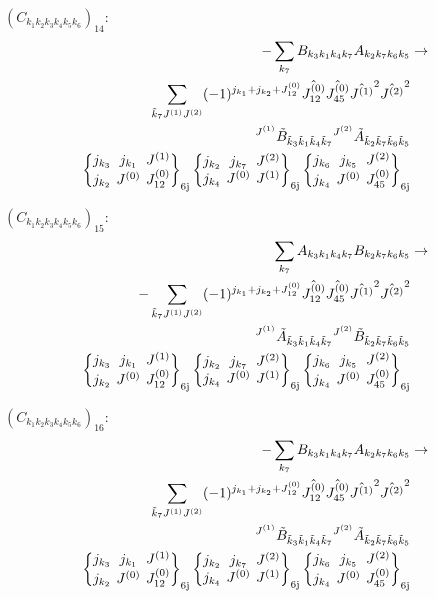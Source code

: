 \documentclass[11pt]{article}
\newcommand{\sixj}[6]{\begingroup\setlength{\arraycolsep}{0.2em}\begin{Bmatrix} #1 & #2 & #3 \\ #4 & #5 & #6 \end{Bmatrix}_{\text{6j}}\endgroup}
\begin{document}
$\left({C}_{{k}_{1}{k}_{2}{k}_{3}{k}_{4}{k}_{5}{k}_{6}}\right)_{14}$:
\begin{align}
-\sum_{{k}_{7}}{B}_{{k}_{3}{k}_{1}{k}_{4}{k}_{7}}{A}_{{k}_{2}{k}_{7}{k}_{6}{k}_{5}}&\rightarrow \notag \\\sum_{\tilde{k}_{7}J^{(1)}J^{(2)}}(-1)^{j_{{k}_{1}} +j_{{k}_{2}} +J^{(0)}_{12} }\hat{J^{(0)}_{12}}\hat{J^{(0)}_{45}}\hat{J^{(1)}}^{2}\hat{J^{(2)}}^{2}& \notag \\{}^{J^{(1)}}\tilde{B}_{\tilde{k}_{3}\tilde{k}_{1}\tilde{k}_{4}\tilde{k}_{7}}{}^{J^{(2)}}\tilde{A}_{\tilde{k}_{2}\tilde{k}_{7}\tilde{k}_{6}\tilde{k}_{5}}& \notag \\\sixj{j_{{k}_{3}}}{j_{{k}_{1}}}{J^{(1)}}{j_{{k}_{2}}}{J^{(0)}}{J^{(0)}_{12}}\sixj{j_{{k}_{2}}}{j_{{k}_{7}}}{J^{(2)}}{j_{{k}_{4}}}{J^{(0)}}{J^{(1)}}\sixj{j_{{k}_{6}}}{j_{{k}_{5}}}{J^{(2)}}{j_{{k}_{4}}}{J^{(0)}}{J^{(0)}_{45}}
\end{align}

$\left({C}_{{k}_{1}{k}_{2}{k}_{3}{k}_{4}{k}_{5}{k}_{6}}\right)_{15}$:
\begin{align}
\sum_{{k}_{7}}{A}_{{k}_{3}{k}_{1}{k}_{4}{k}_{7}}{B}_{{k}_{2}{k}_{7}{k}_{6}{k}_{5}}&\rightarrow \notag \\-\sum_{\tilde{k}_{7}J^{(1)}J^{(2)}}(-1)^{j_{{k}_{1}} +j_{{k}_{2}} +J^{(0)}_{12} }\hat{J^{(0)}_{12}}\hat{J^{(0)}_{45}}\hat{J^{(1)}}^{2}\hat{J^{(2)}}^{2}& \notag \\{}^{J^{(1)}}\tilde{A}_{\tilde{k}_{3}\tilde{k}_{1}\tilde{k}_{4}\tilde{k}_{7}}{}^{J^{(2)}}\tilde{B}_{\tilde{k}_{2}\tilde{k}_{7}\tilde{k}_{6}\tilde{k}_{5}}& \notag \\\sixj{j_{{k}_{3}}}{j_{{k}_{1}}}{J^{(1)}}{j_{{k}_{2}}}{J^{(0)}}{J^{(0)}_{12}}\sixj{j_{{k}_{2}}}{j_{{k}_{7}}}{J^{(2)}}{j_{{k}_{4}}}{J^{(0)}}{J^{(1)}}\sixj{j_{{k}_{6}}}{j_{{k}_{5}}}{J^{(2)}}{j_{{k}_{4}}}{J^{(0)}}{J^{(0)}_{45}}
\end{align}

$\left({C}_{{k}_{1}{k}_{2}{k}_{3}{k}_{4}{k}_{5}{k}_{6}}\right)_{16}$:
\begin{align}
-\sum_{{k}_{7}}{B}_{{k}_{3}{k}_{1}{k}_{4}{k}_{7}}{A}_{{k}_{2}{k}_{7}{k}_{6}{k}_{5}}&\rightarrow \notag \\\sum_{\tilde{k}_{7}J^{(1)}J^{(2)}}(-1)^{j_{{k}_{1}} +j_{{k}_{2}} +J^{(0)}_{12} }\hat{J^{(0)}_{12}}\hat{J^{(0)}_{45}}\hat{J^{(1)}}^{2}\hat{J^{(2)}}^{2}& \notag \\{}^{J^{(1)}}\tilde{B}_{\tilde{k}_{3}\tilde{k}_{1}\tilde{k}_{4}\tilde{k}_{7}}{}^{J^{(2)}}\tilde{A}_{\tilde{k}_{2}\tilde{k}_{7}\tilde{k}_{6}\tilde{k}_{5}}& \notag \\\sixj{j_{{k}_{3}}}{j_{{k}_{1}}}{J^{(1)}}{j_{{k}_{2}}}{J^{(0)}}{J^{(0)}_{12}}\sixj{j_{{k}_{2}}}{j_{{k}_{7}}}{J^{(2)}}{j_{{k}_{4}}}{J^{(0)}}{J^{(1)}}\sixj{j_{{k}_{6}}}{j_{{k}_{5}}}{J^{(2)}}{j_{{k}_{4}}}{J^{(0)}}{J^{(0)}_{45}}
\end{align}
\end{document}
